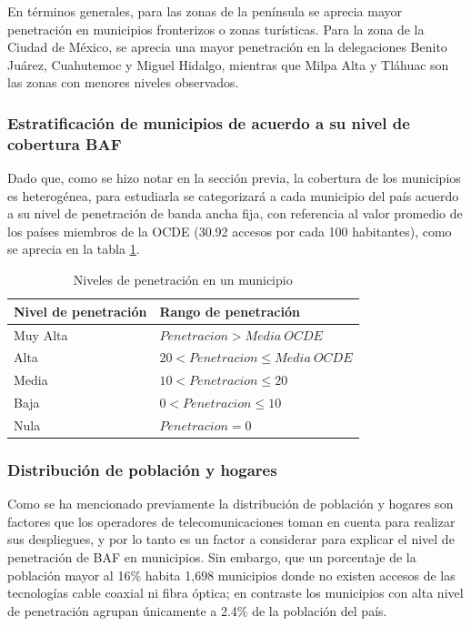 \documentclass[9pt,twocolumn,twoside]{ilcss}
\begin{document}
 En términos generales, para las zonas de la península se aprecia mayor penetración en municipios fronterizos o zonas turísticas. Para la zona de la Ciudad de México, se aprecia una mayor penetración en la delegaciones Benito Juárez, Cuahutemoc  y Miguel Hidalgo, mientras que Milpa Alta y Tláhuac son las zonas con menores niveles observados.

\subsubsection{Estratificación de municipios de acuerdo a su nivel de cobertura BAF}

Dado que, como se hizo notar en la sección previa, la cobertura de los municipios es heterogénea, para estudiarla se categorizará a cada municipio del país acuerdo a su nivel de penetración de banda ancha fija, con referencia al valor promedio de los países miembros de la OCDE (30.92 accesos por cada 100 habitantes), como se aprecia en la tabla 
\ref{table:clasifpen}.

\begin{table}[tbhp]
	\centering
	\caption{Niveles de penetración en un municipio\label{table:clasifpen}}
	\begin{tabular}{@{}ll@{}}
		\toprule
		Nivel de penetración & Rango  de penetración            \\ \midrule
		Muy Alta  & $Penetracion > Media \ OCDE$         \\ 
		Alta    & $20 < Penetracion \leq Media \ OCDE$ \\ 
		Media    & $10 < Penetracion \leq 20$  \\ 
		Baja      & $0 < Penetracion \leq 10$  \\ 
		Nula      & $Penetracion =0$            \\ \bottomrule
	\end{tabular}
\end{table}


\subsubsection{Distribución de población y hogares}

Como se ha mencionado previamente la distribución de población y hogares son factores que los operadores de telecomunicaciones toman en cuenta para realizar sus despliegues, y por lo tanto es un factor a considerar para explicar el nivel de penetración de BAF en municipios. Sin embargo, que un porcentaje de la población mayor al 16\% habita 1,698 municipios donde no existen accesos de las tecnologías cable coaxial ni fibra óptica; en contraste los municipios con alta nivel de penetración agrupan únicamente a 2.4\% de la población del país.
\end{document}
